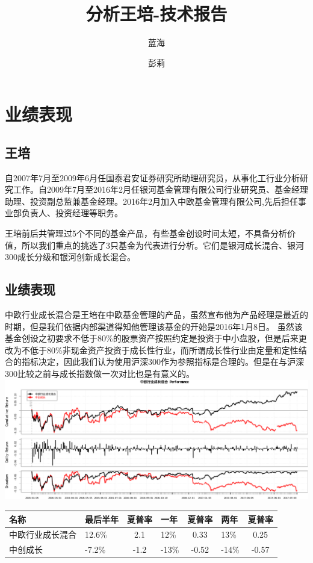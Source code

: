 \documentclass[hyperref,]{ctexart}
\title{分析王培-技术报告}
\author{蓝海 \and 彭莉}
\date{}
\begin{document}
\maketitle

{
\setcounter{tocdepth}{2}
\tableofcontents
}
\section{业绩表现}

\subsection{王培}

自2007年7月至2009年6月任国泰君安证券研究所助理研究员，从事化工行业分析研究工作。自2009年7月至2016年2月任银河基金管理有限公司行业研究员、基金经理助理、投资副总监兼基金经理。2016年2月加入中欧基金管理有限公司,先后担任事业部负责人、投资经理等职务。

王培前后共管理过5个不同的基金产品，有些基金创设时间太短，不具备分析价值，所以我们重点的挑选了3只基金为代表进行分析。它们是银河成长混合、银河300成长分级和银河创新成长混合。

\subsection{业绩表现}\label{-1}

中欧行业成长混合是王培在中欧基金管理的产品，虽然宣布他为产品经理是最近的时期，但是我们依据内部渠道得知他管理该基金的开始是2016年1月8日。
虽然该基金创设之初要求不低于80\%的股票资产按照约定是投资于中小盘股，但是后来更改为不低于80\%非现金资产投资于成长性行业，而所谓成长性行业由定量和定性结合的指标决定，因此我们认为使用沪深300作为参照指标是合理的。但是在与沪深300比较之前与成长指数做一次对比也是有意义的。
\includegraphics{wangpei-details_files/figure-latex/unnamed-chunk-2-1.pdf}

\begin{longtable}[]{@{}llclclc@{}}
\toprule
名称 & 最后半年 & 夏普率 & 一年 & 夏普率 & 两年 & 夏普率\tabularnewline
\midrule
\endhead
中欧行业成长混合 & 12.6\% & 2.1 & 12\% & 0.33 & 13\% &
0.25\tabularnewline
中创成长 & -7.2\% & -1.2 & -13\% & -0.52 & -14\% & -0.57\tabularnewline
\bottomrule
\end{longtable}
\end{document}
